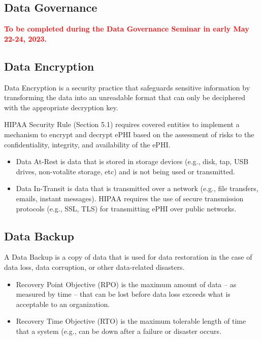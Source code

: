 \subsection{Data Governance}
\textcolor{red}{\textbf{To be completed during the Data Governance Seminar in early May 22-24, 2023.}}

\subsection{Data Encryption}

Data Encryption is a security practice that safeguards sensitive information by transforming the data into an unreadable format that can only be deciphered with the appropriate decryption key. 

HIPAA Security Rule (Section 5.1) requires covered entities to implement a mechanism to encrypt and decrypt ePHI based on the assessment of risks to the confidentiality, integrity, and availability of the ePHI. 

\begin{itemize}
    \item Data At-Rest is data that is stored in storage devices (e.g., disk, tap, USB drives, non-votalite storage, etc) and is not being used or transmitted.
    \item Data In-Transit is data that is transmitted over a network (e.g., file transfers, emails, instant messages). HIPAA requires the use of secure transmission protocols (e.g., SSL, TLS) for transmitting ePHI over public networks. 
\end{itemize}

\subsection{Data Backup}

A Data Backup is a copy of data that is used for data restoration in the case of data loss, data corruption, or other data-related disasters.

\begin{itemize}
    \item Recovery Point Objective (RPO) is the maximum amount of data – as measured by time – that can be lost before data loss exceeds what is acceptable to an organization.
    \item Recovery Time Objective (RTO) is the maximum tolerable length of time that a system (e.g., can be down after a failure or disaster occurs. 
\end{itemize}

